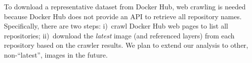 To download a representative dataset from Docker Hub, web crawling is needed
because Docker Hub does not provide an API to retrieve all repository names.
%
%
Specifically, there are two steps: i)~crawl Docker Hub web pages to list all
repositories; ii)~download the \textit{latest} image (and referenced layers)
from each repository based on the crawler results.
%
%
We plan to extend our analysis to other, non-``latest'', images in the future.
%
%
%
%
